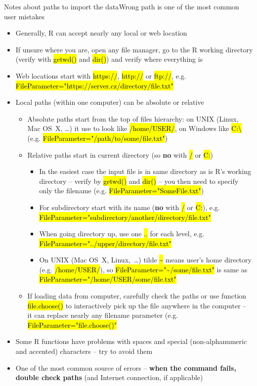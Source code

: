 \documentclass[compress, ucs, xelatex, 11pt, xcolor=svgnames,
  hyperref={
    bookmarks=true,
    unicode=true,
    colorlinks=true,
    pdftitle={Molecular data in R},
    plainpages=false,
    pdfauthor={Vojtech Zeisek},
    pdfsubject={Course about phylogeny and evolution in R},
    pdfcreator={XeLaTeX},
    pdfkeywords={R, evolution, phylogeny, molecular data},
    linkcolor=Tomato,
    anchorcolor=SaddleBrown,
    citecolor=Goldenrod,
    filecolor=DarkMagenta,
    menucolor=Sienna,
    urlcolor=DarkTurquoise,
    pdftex},
  url={hyphens, lowtilde} %
  ]{beamer}
\renewcommand{\texttt}[1]{\hl{\ttfamily #1}}
\begin{document}
\begin{frame}[allowframebreaks]{Notes about paths to import the data}{Wrong path is one of the most common user mistakes}
\begin{itemize}
 \item Generally, R can accept nearly any local or web location
 \item If unsure where you are, open any file manager, go to the R working directory (verify with \texttt{getwd()} and \texttt{dir()}) and verify where everything is
 \item Web locations start with \texttt{https://}, \texttt{http://} or \texttt{ftp://}, e.g. \texttt{FileParameter="https://server.cz/directory/file.txt"}
 \item Local paths (within one computer) can be absolute or relative
 \begin{itemize}
  \item Absolute paths start from the top of files hierarchy: on UNIX (Linux, Mac OS~X, \ldots) it use to look like \texttt{/home/USER/}, on Windows like \texttt{C:\textbackslash} (e.g. \texttt{FileParameter="/path/to/some/file.txt"})
  \item Relative paths start in current directory (so \textbf{no} with \texttt{/} or \texttt{C:})
  \begin{itemize}
    \item In the easiest case the input file is in same directory as is R's working directory -- verify by \texttt{getwd()} and \texttt{dir()} -- you then need to specify only the filename (e.g. \texttt{FileParameter="SomeFile.txt"})
    \item For subdirectory start with its name (\textbf{no} with \texttt{/} or \texttt{C:}), e.g. \texttt{FileParameter="subdirectory/another/directory/file.txt"}
    \item When going directory up, use one \texttt{..} for each level, e.g. \texttt{FileParameter="../upper/directory/file.txt"}
    \item On UNIX (Mac OS~X, Linux,~\ldots) tilde \texttt{\textasciitilde} means user's home directory (e.g. \texttt{/home/USER/}), so \texttt{FileParameter="\textasciitilde/some/file.txt"} is same as \texttt{FileParameter="/home/USER/some/file.txt"}
  \end{itemize}
  \item If loading data from computer, carefully check the paths or use function \texttt{file.choose()} to interactively pick up the file anywhere in the computer -- it can replace nearly any filename parameter (e.g. \texttt{FileParameter="file.choose()"}
 \end{itemize}
 \item Some R functions have problems with spaces and special (non-alphanumeric and accented) characters -- try to avoid them
 \item One of the most common source of errors -- \textbf{when the command fails, double check paths} (and Internet connection, if applicable)
\end{itemize}
\end{frame}
\end{document}
